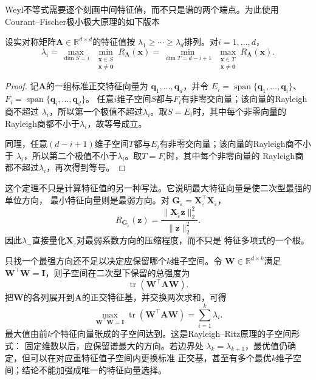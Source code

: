 Weyl不等式需要逐个刻画中间特征值，而不只是谱的两个端点。为此使用
Courant--Fischer极小极大原理的如下版本

\begin{theorem}
\label{thm:matrix-analysis-courant-fischer}
设实对称矩阵$\bm{A}\in\mathbb{R}^{d\times d}$的特征值按
$\lambda_1\geq\cdots\geq\lambda_d$排列。对$i=1,\ldots,d$，
\begin{equation}
  \lambda_i
  =
  \max_{\dim S=i}\ \min_{\substack{\bm{x}\in S\\\bm{x}\neq\bm{0}}}
  R_{\bm{A}}(\bm{x})
  =
  \min_{\dim T=d-i+1}\ \max_{\substack{\bm{x}\in T\\\bm{x}\neq\bm{0}}}
  R_{\bm{A}}(\bm{x}).
  \label{eq:matrix-analysis-courant-fischer}
\end{equation}
\end{theorem}

\begin{proof}
记$\bm{A}$的一组标准正交特征向量为
$\bm{q}_1,\ldots,\bm{q}_d$，并令
$E_i=\operatorname{span}\{\bm{q}_1,\ldots,\bm{q}_i\}$、
$F_i=\operatorname{span}\{\bm{q}_i,\ldots,\bm{q}_d\}$。
任意$i$维子空间$S$都与$F_i$有非零交向量；该向量的Rayleigh商不超过
$\lambda_i$，所以第一个极值不超过$\lambda_i$。取$S=E_i$时，其中每个非零向量的
Rayleigh商都不小于$\lambda_i$，故等号成立。

同理，任意$(d-i+1)$维子空间$T$都与$E_i$有非零交向量；该向量的Rayleigh商不小于
$\lambda_i$，所以第二个极值不小于$\lambda_i$。取$T=F_i$时，其中每个非零向量的
Rayleigh商都不超过$\lambda_i$，再次得到等号。
\end{proof}

这个定理不只是计算特征值的另一种写法。它说明最大特征向量是使二次型最强的单位方向，
最小特征向量则是最弱方向。对
$\bm{G}_{\widetilde{\varepsilon}}=\bm{X}_{\widetilde{\varepsilon}}^{\top}\bm{X}_{\widetilde{\varepsilon}}$，
\[
  R_{\bm{G}_{\widetilde{\varepsilon}}}(\bm{z})=
  \frac{\lVert\bm{X}_{\widetilde{\varepsilon}}\bm{z}\rVert_2^2}
       {\lVert\bm{z}\rVert_2^2}.
\]
因此$\lambda_-$直接量化$\bm{X}_{\widetilde{\varepsilon}}$对最弱系数方向的压缩程度，而不只是
特征多项式的一个根。

只找一个最强方向还不足以决定应保留哪个$k$维子空间。令
$\bm{W}\in\mathbb{R}^{d\times k}$满足
$\bm{W}^{\top}\bm{W}=\bm{I}$，则子空间在二次型下保留的总强度为
\[
  \operatorname{tr}(\bm{W}^{\top}\bm{A}\bm{W}).
\]
把$\bm{W}$的各列展开到$\bm{A}$的正交特征基，并交换两次求和，可得
\[
  \max_{\bm{W}^{\top}\bm{W}=\bm{I}}
  \operatorname{tr}(\bm{W}^{\top}\bm{A}\bm{W})
  =\sum_{i=1}^{k}\lambda_i.
\]
最大值由前$k$个特征向量张成的子空间达到。这是Rayleigh--Ritz原理的子空间形式：
固定维数以后，应保留谱最大的方向。若边界处
$\lambda_k=\lambda_{k+1}$，最优值仍确定，但可以在对应重特征值子空间内更换标准
正交基，甚至有多个最优$k$维子空间；结论不能加强成唯一的特征向量选择。

